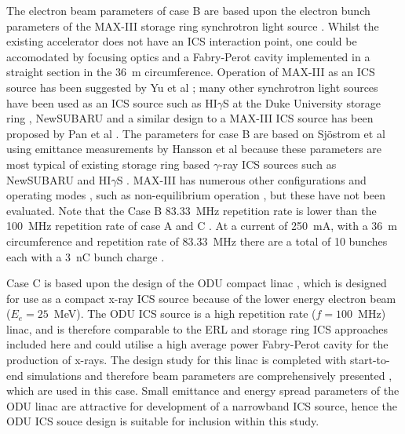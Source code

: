 \documentclass[../main.tex]{subfiles}
\begin{document}
The electron beam parameters of case B are based upon the electron bunch parameters of the MAX-III storage ring synchrotron light source \cite{sjostrom2009max,hansson2011imaging,rosborg2012electron}. Whilst the existing accelerator does not have an ICS interaction point, one could be accomodated by focusing optics and a Fabry-Perot cavity implemented in a straight section in the 36~\si{\metre} circumference. Operation of MAX-III as an ICS source has been suggested by Yu et al \cite{yu2009lattice,owen2013nonequilibrium}; many other synchrotron light sources have been used as an ICS source such as HI$\gamma$S at the Duke University storage ring \cite{weller2009research}, NewSUBARU \cite{utsunomiya2015gamma} and a similar design to a MAX-III ICS source has been proposed by Pan et al \cite{pan2019design}. The parameters for case B are based on Sj\"{o}strom et al \cite{sjostrom2009max} using emittance measurements by Hansson et al \cite{hansson2011imaging} because these parameters are most typical of existing storage ring based $\gamma$-ray ICS sources such as NewSUBARU \cite{utsunomiya2015gamma} and HI$\gamma$S \cite{weller2009research}.  MAX-III has numerous other configurations and operating modes \cite{sjostrom2009max}, such as non-equilibrium operation \cite{owen2012modular}, but these have not been evaluated. Note that the Case B 83.33~\si{\mega\hertz} repetition rate is lower than the 100~\si{\mega\hertz} repetition rate of case A and C \cite{sjostrom2009max,rosborg2012electron}. At a current of 250~\si{\milli\ampere}, with a 36~\si{\meter} circumference and repetition rate of 83.33~\si{\mega\hertz} \cite{sjostrom2009max,rosborg2012electron} there are a total of 10 bunches each with a 3~\si{\nano\coulomb} bunch charge .

Case C is based upon the design of the ODU compact linac \cite{krafft2016laser,deitrick2017inverse,deitrick2018high}, which is designed for use as a compact x-ray ICS source because of the lower energy electron beam ($E_{e} = 25$~\si{\mega\electronvolt}). The ODU ICS source is a high repetition rate ($f = 100$~\si{\mega\hertz}) linac, and is therefore comparable to the ERL and storage ring ICS approaches included here and could utilise a high average power Fabry-Perot cavity for the production of x-rays. The design study for this linac is completed with start-to-end simulations and therefore beam parameters are comprehensively presented \cite{deitrick2017inverse,deitrick2018high}, which are used in this case. Small emittance and energy spread parameters of the ODU linac are attractive for development of a narrowband ICS source, hence the ODU ICS souce design is suitable for inclusion within this study.  
\end{document}
